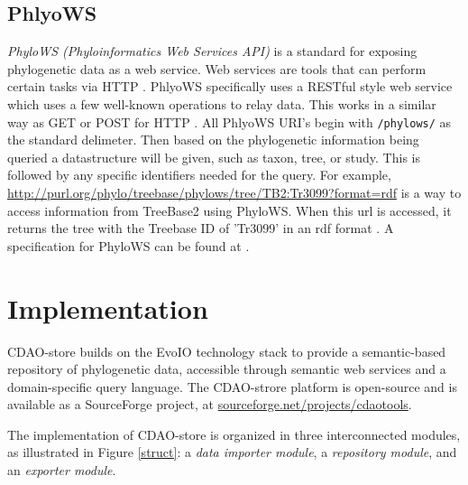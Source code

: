 \documentclass[10pt]{bmc_article}
\newenvironment{bmcformat}{\fussy\setboolean{publ}{true}}{\fussy}
\begin{document}
\begin{bmcformat}
\subsection*{PhlyoWS}
  \emph{PhyloWS (Phyloinformatics Web Services API)} is a standard for exposing 
  phylogenetic data as a web service. Web services are tools that can perform certain tasks via HTTP \cite{WebService}.
  PhlyoWS specifically uses a RESTful style web service which uses a few well-known operations to relay data\cite{PhyloWSwiki}\cite{Fielding02principleddesign}.
  This works in a similar way as GET or POST for HTTP  \cite{Fielding02principleddesign}.  All PhlyoWS URI's begin with {\tt /phylows/} as the 
  standard delimeter. Then based on the phylogenetic information being queried a datastructure will be given, such as taxon, tree, or study.
  This is followed by any specific identifiers needed for the query.  For example, \url{http://purl.org/phylo/treebase/phylows/tree/TB2:Tr3099?format=rdf}
  is a way to access information from TreeBase2 using PhyloWS.  When this url is accessed, it returns the tree with the Treebase ID of 'Tr3099' in an
  rdf format \cite{treebasePhyloWS}. A specification for PhyloWS can be found at \cite{PhyloWSwiki}.
\section*{Implementation}

CDAO-store builds on the EvoIO technology stack to provide a 
semantic-based repository of phylogenetic data, accessible through
semantic web services and a domain-specific query language.
The CDAO-strore platform is open-source and is available as
a SourceForge project, at \url{sourceforge.net/projects/cdaotools}. 

The implementation of CDAO-store is organized in three interconnected
modules, as illustrated in Figure \ref{struct}:
a \emph{data importer module}, a \emph{repository module}, and
an  \emph{exporter module}. 


\end{bmcformat}
\end{document}
